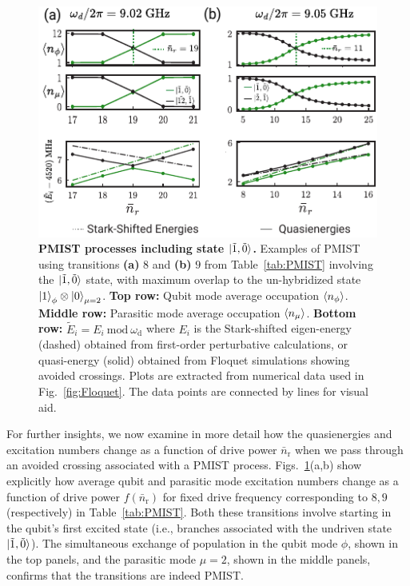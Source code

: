 \documentclass[%
reprint,
superscriptaddress,
 amsmath,amssymb,
 aps,
 prx,
longbibliography,
floatfix,
]{revtex4-2}
\begin{document}
 \begin{figure}[t]
    \centering
    \includegraphics[width=\linewidth]{Figures/Floquet_011.pdf}
    \caption{{\bf PMIST processes including state $\ket{\tilde{1},\tilde{0}}$.} Examples of PMIST using transitions \textbf{(a)} $8$ and \textbf{(b)} $9$ from Table~\ref{tab:PMIST} involving the $\ket{\tilde{1},\tilde{0}}$ state, with maximum overlap to the un-hybridized state $\ket{1}_\phi\otimes\ket{0}_{\mu=2}$. \textbf{Top row:} Qubit mode average occupation $\braket{n_\phi}$. \textbf{Middle row:} Parasitic mode average occupation $\braket{n_\mu}$. \textbf{Bottom row:} $\tilde{E}_i=E_i \ \textrm{mod} \ \omega_\textrm{d}$ where $E_i$ is the Stark-shifted eigen-energy (dashed) obtained from first-order perturbative calculations, or quasi-energy (solid) obtained from Floquet simulations showing avoided crossings. Plots are extracted from numerical data used in Fig.~\ref{fig:Floquet}. The data points are connected by lines for visual aid.}
    \label{fig:011}
\end{figure}

For further insights, we now examine in more detail how the quasienergies and excitation numbers change as a function of drive power $\bar{n}_\textrm{r}$ when we pass through an avoided crossing associated with a PMIST process. Figs.~\ref{fig:011}(a,b) show explicitly how average qubit and parasitic mode excitation numbers change as a function of drive power $f(\bar n_\textrm{r})$ for fixed drive frequency corresponding to $8,9$ (respectively) in Table~\ref{tab:PMIST}. Both these transitions involve starting in the qubit's first excited state (i.e., branches associated with the undriven state $\ket{\tilde{1},\tilde{0}}$). The simultaneous exchange of population in the qubit mode $\phi$, shown in the top panels, and the parasitic mode $\mu=2$, shown in the middle panels, confirms that the transitions are indeed PMIST.
\end{document}
